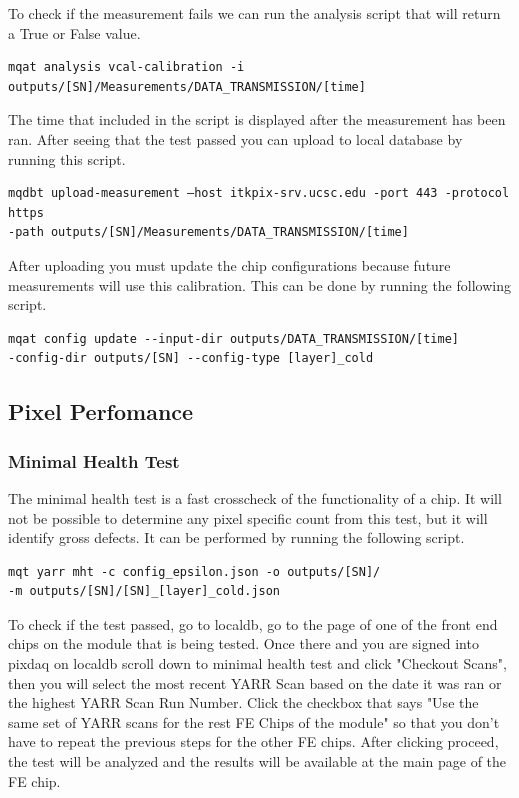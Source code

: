 \documentclass[12pt]{article}
\begin{document}
To check if the measurement fails we can run the analysis script that will return a True or False value. 
\begin{verbatim}
mqat analysis vcal-calibration -i outputs/[SN]/Measurements/DATA_TRANSMISSION/[time]
\end{verbatim}

The time that included in the script is displayed after the measurement has been ran. After seeing that the test passed you can upload to local database by running this script. 

\begin{verbatim}
mqdbt upload-measurement –host itkpix-srv.ucsc.edu -port 443 -protocol https
-path outputs/[SN]/Measurements/DATA_TRANSMISSION/[time]
\end{verbatim}
After uploading you must update the chip configurations because future measurements will use this calibration. This can be done by running the following script. 
\begin{verbatim}
mqat config update --input-dir outputs/DATA_TRANSMISSION/[time] 
-config-dir outputs/[SN] --config-type [layer]_cold
\end{verbatim}

\subsection{Pixel Perfomance}



\subsubsection{Minimal Health Test}

The minimal health test is a fast crosscheck of the functionality of a chip. It will not be possible to determine any pixel specific count from this test, but it will identify gross defects. It can be performed by running the following script. 

\begin{verbatim}
mqt yarr mht -c config_epsilon.json -o outputs/[SN]/
-m outputs/[SN]/[SN]_[layer]_cold.json 
\end{verbatim}

To check if the test passed, go to localdb, go to the page of one of the front end chips on the module that is being tested. Once there and you are signed into pixdaq on localdb scroll down to minimal health test and click "Checkout Scans", then you will select the most recent YARR Scan based on the date it was ran or the highest YARR Scan Run Number. Click the checkbox that says "Use the same set of YARR scans for the rest FE Chips of the module" so that you don't have to repeat the previous steps for the other FE chips. After clicking proceed, the test will be analyzed and the results will be available at the main page of the FE chip. 
\end{document}
